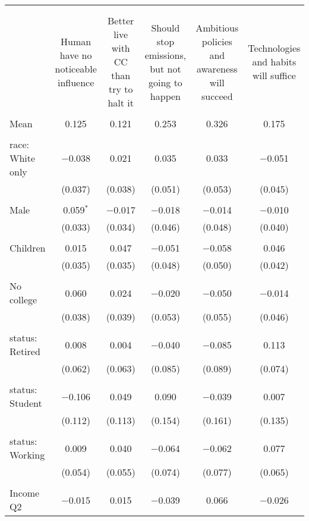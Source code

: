 
\begin{tabular}{@{\extracolsep{5pt}}lccccc} 
\\[-1.8ex]\hline 
\hline \\[-1.8ex] 
\\[-1.8ex] & Human have no noticeable influence & Better live with CC than try to halt it & Should stop emissions, but not going to happen & Ambitious policies and awareness will succeed & Technologies and habits will suffice \\ 
\hline \\[-1.8ex] 
 Mean & 0.125 & 0.121 & 0.253 & 0.326 & 0.175  \\ \hline \\[-1.8ex] race: White only & $-$0.038 & 0.021 & 0.035 & 0.033 & $-$0.051 \\ 
  & (0.037) & (0.038) & (0.051) & (0.053) & (0.045) \\ 
  & & & & & \\ 
 Male & 0.059$^{*}$ & $-$0.017 & $-$0.018 & $-$0.014 & $-$0.010 \\ 
  & (0.033) & (0.034) & (0.046) & (0.048) & (0.040) \\ 
  & & & & & \\ 
 Children & 0.015 & 0.047 & $-$0.051 & $-$0.058 & 0.046 \\ 
  & (0.035) & (0.035) & (0.048) & (0.050) & (0.042) \\ 
  & & & & & \\ 
 No college & 0.060 & 0.024 & $-$0.020 & $-$0.050 & $-$0.014 \\ 
  & (0.038) & (0.039) & (0.053) & (0.055) & (0.046) \\ 
  & & & & & \\ 
 status: Retired & 0.008 & 0.004 & $-$0.040 & $-$0.085 & 0.113 \\ 
  & (0.062) & (0.063) & (0.085) & (0.089) & (0.074) \\ 
  & & & & & \\ 
 status: Student & $-$0.106 & 0.049 & 0.090 & $-$0.039 & 0.007 \\ 
  & (0.112) & (0.113) & (0.154) & (0.161) & (0.135) \\ 
  & & & & & \\ 
 status: Working & 0.009 & 0.040 & $-$0.064 & $-$0.062 & 0.077 \\ 
  & (0.054) & (0.055) & (0.074) & (0.077) & (0.065) \\ 
  & & & & & \\ 
 Income Q2 & $-$0.015 & 0.015 & $-$0.039 & 0.066 & $-$0.026 \\ 

\end{tabular}
